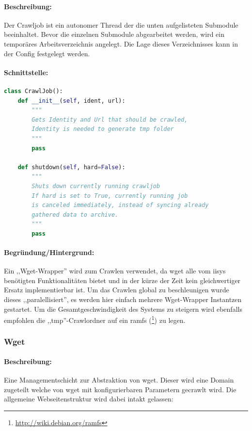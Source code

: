 
\paragraph{Beschreibung:}
\label{par:beschreibung_}
Der Crawljob ist ein autonomer Thread der die unten aufgelisteten Submodule beeinhaltet.
Bevor die einzelnen Submodule abgearbeitet werden, wird ein temporäres Arbeitsverzeichnis angelegt.
Die Lage dieses Verzeichnisses kann in der Config festgelegt werden.
\paragraph{Schnittstelle:}
\label{par:api_}
\hfill

\begin{lstlisting}[language=python]
class CrawlJob():
    def __init__(self, ident, url):
        """
        Gets Identity and Url that should be crawled,
        Identity is needed to generate tmp folder
        """
        pass

    def shutdown(self, hard=False): 
        """
        Shuts down currently running crawljob
        If hard is set to True, currently running job
        is canceled immediately, instead of syncing already
        gathered data to archive.
        """
        pass
\end{lstlisting}
\paragraph{Begründung/Hintergrund:}
\label{par:begr_ndung_hintergrund_}
Ein ,,Wget-Wrapper'' wird zum Crawlen verwendet, da wget alle vom iisys benötigten Funktionalitäten bietet und
in der kürze der Zeit kein gleichwertiger Ersatz implementierbar ist. Um das Crawlen global zu 
beschleunigen wurde dieses ,,paralellisiert'', es werden hier einfach mehrere Wget-Wrapper Instantzen gestartet.
Um die Gesamtgeschwindigkeit des Systems zu steigern wird ebenfalls empfohlen die ,,tmp''-Crawlordner auf ein
ramfs (\footnote{\url{http://wiki.debian.org/ramfs}}) zu legen.

\subsubsection{Wget}
\label{ssub:wget}
\paragraph{Beschreibung:}
\label{par:beschreibung_}
Eine Managementschicht zur Abstraktion von wget.
Dieser wird eine Domain zugeteilt welche von wget mit konfigurierbaren Parametern gecrawlt wird.
Die allgemeine Webseitenstruktur wird dabei intakt gelassen:

